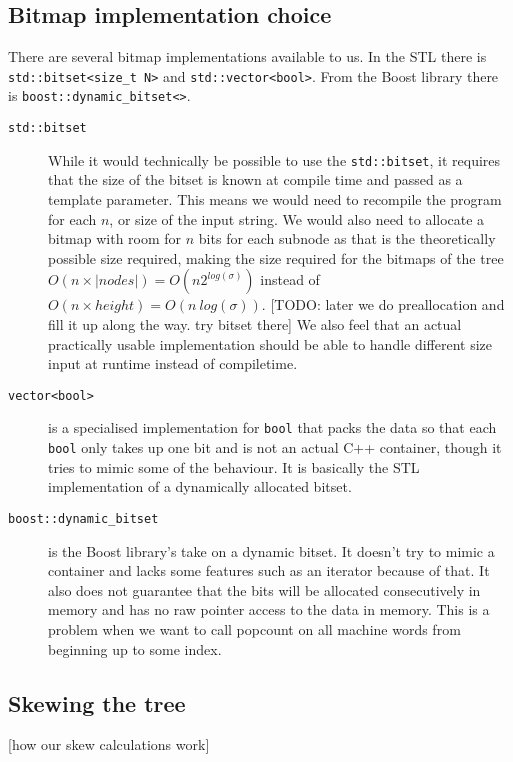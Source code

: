 \subsection{Bitmap implementation choice}
There are several bitmap implementations available to us. In the STL there is \texttt{std::bitset<size\_t N>} and \texttt{std::vector<bool>}. From the Boost library there is \texttt{boost::dynamic\_bitset<>}.
\begin{description}
\item[\texttt{std::bitset}] While it would technically be possible to use the \texttt{std::bitset}, it requires that the size of the bitset is known at compile time and passed as a template parameter. This means we would need to recompile the program for each $n$, or size of the input string. We would also need to allocate a bitmap with room for $n$ bits for each subnode as that is the theoretically possible size required, making the size required for the bitmaps of the tree $O(n \times |nodes|) = O(n2^{log(\sigma)})$ instead of $O(n \times height) = O(n~log(\sigma))$.
[TODO: later we do preallocation and fill it up along the way. try bitset there]
We also feel that an actual practically usable implementation should be able to handle different size input at runtime instead of compiletime. 

\item[\texttt{vector<bool>}] is a specialised implementation for \texttt{bool} that packs the data so that each \texttt{bool} only takes up one bit and is not an actual C++ container, though it tries to mimic some of the behaviour. It is basically the STL implementation of a dynamically allocated bitset.

\item[\texttt{boost::dynamic\_bitset}] is the Boost library's take on a dynamic bitset. It doesn't try to mimic a container and lacks some features such as an iterator because of that. It also does not guarantee that the bits will be allocated consecutively in memory and has no raw pointer access to the data in memory. This is a problem when we want to call popcount on all machine words from beginning up to some index.
\end{description}

\subsection{Skewing the tree}
[how our skew calculations work]

